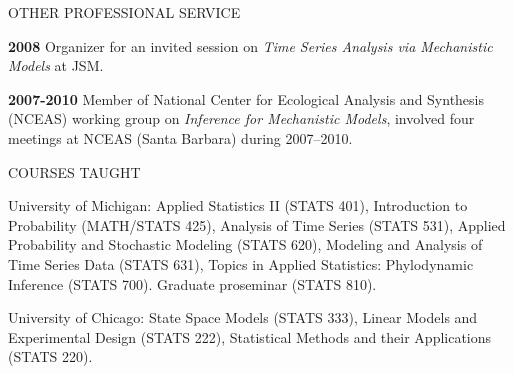 \begin{mylist}{OTHER PROFESSIONAL SERVICE}
\item{\bf 2008 } Organizer for an invited session on {\it Time Series Analysis via Mechanistic Models} at JSM.

\item {\bf 2007-2010 } Member of National Center for Ecological Analysis and Synthesis (NCEAS) working group on {\it Inference for Mechanistic Models}, involved four meetings at NCEAS (Santa Barbara) during 2007--2010.
 




\end{mylist}


\lsp


\begin{mylist}{COURSES TAUGHT}

\item{University of Michigan}: 
Applied Statistics II (STATS 401), 
Introduction to Probability (MATH/STATS 425), 
Analysis of Time Series (STATS 531), 
Applied Probability and Stochastic Modeling (STATS 620),
Modeling and Analysis of Time Series Data (STATS 631),
Topics in Applied Statistics: Phylodynamic Inference (STATS 700).
Graduate proseminar (STATS 810).

\item{University of Chicago}: State Space
Models (STATS 333), Linear Models and Experimental Design (STATS 222),
Statistical Methods and their Applications (STATS 220). 

\end{mylist}

\lsp

